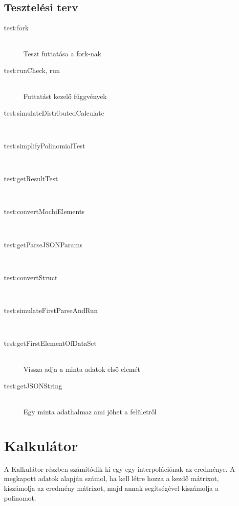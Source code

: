 \subsection{Tesztelési terv}
	\begin{description}
		\item[test:fork] \hfill \\
			Teszt futtatása a fork-nak

		\item[test:runCheck, run] \hfill \\
			Futtatást kezelő függvények 

		\item[test:simulateDistributedCalculate] \hfill \\

		\item[test:simplifyPolinomialTest] \hfill \\

		\item[test:getResultTest] \hfill \\

		\item[test:convertMochiElements] \hfill \\

		\item[test:getParseJSONParams] \hfill \\

		\item[test:convertStruct] \hfill \\
		\item[test:simulateFirstParseAndRun] \hfill \\
		\item[test:getFirstElementOfDataSet] \hfill \\
		Vissza adja a minta adatok első elemét
		\item[test:getJSONString] \hfill \\
		Egy minta adathalmaz ami jöhet a felületről
\end{description}	

\section{Kalkulátor}
A Kalkulátor részben számítódik ki egy-egy interpolációnak az eredménye.
A megkapott adatok alapján számol, ha kell létre hozza a kezdő mátrixot, kiszámolja az eredmény mátrixot, majd annak segítségével kiszámolja a polinomot. \newline

